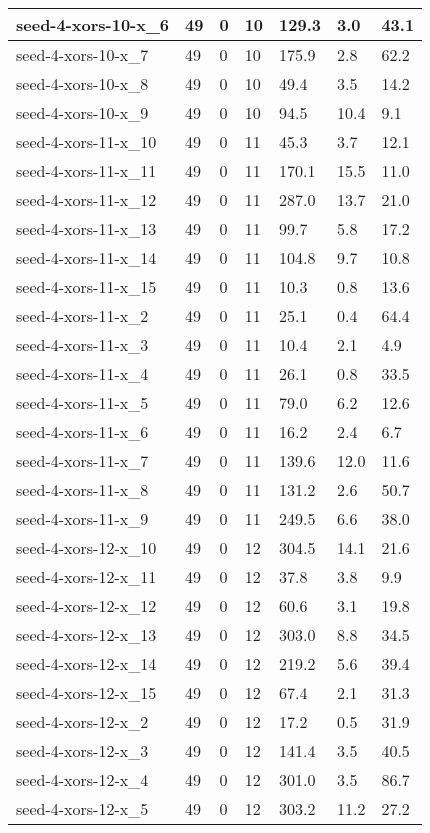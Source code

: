 \begin{scriptsize}
\begin{longtable}{|p{5cm}|l|l|l|l|l|l|}
seed-4-xors-10-x\_6&49&0&10&129.3&3.0&43.1 \\ \hline 
seed-4-xors-10-x\_7&49&0&10&175.9&2.8&62.2 \\ \hline 
seed-4-xors-10-x\_8&49&0&10&49.4&3.5&14.2 \\ \hline 
seed-4-xors-10-x\_9&49&0&10&94.5&10.4&9.1 \\ \hline 
seed-4-xors-11-x\_10&49&0&11&45.3&3.7&12.1 \\ \hline 
seed-4-xors-11-x\_11&49&0&11&170.1&15.5&11.0 \\ \hline 
seed-4-xors-11-x\_12&49&0&11&287.0&13.7&21.0 \\ \hline 
seed-4-xors-11-x\_13&49&0&11&99.7&5.8&17.2 \\ \hline 
seed-4-xors-11-x\_14&49&0&11&104.8&9.7&10.8 \\ \hline 
seed-4-xors-11-x\_15&49&0&11&10.3&0.8&13.6 \\ \hline 
seed-4-xors-11-x\_2&49&0&11&25.1&0.4&64.4 \\ \hline 
seed-4-xors-11-x\_3&49&0&11&10.4&2.1&4.9 \\ \hline 
seed-4-xors-11-x\_4&49&0&11&26.1&0.8&33.5 \\ \hline 
seed-4-xors-11-x\_5&49&0&11&79.0&6.2&12.6 \\ \hline 
seed-4-xors-11-x\_6&49&0&11&16.2&2.4&6.7 \\ \hline 
seed-4-xors-11-x\_7&49&0&11&139.6&12.0&11.6 \\ \hline 
seed-4-xors-11-x\_8&49&0&11&131.2&2.6&50.7 \\ \hline 
seed-4-xors-11-x\_9&49&0&11&249.5&6.6&38.0 \\ \hline 
seed-4-xors-12-x\_10&49&0&12&304.5&14.1&21.6 \\ \hline 
seed-4-xors-12-x\_11&49&0&12&37.8&3.8&9.9 \\ \hline 
seed-4-xors-12-x\_12&49&0&12&60.6&3.1&19.8 \\ \hline 
seed-4-xors-12-x\_13&49&0&12&303.0&8.8&34.5 \\ \hline 
seed-4-xors-12-x\_14&49&0&12&219.2&5.6&39.4 \\ \hline 
seed-4-xors-12-x\_15&49&0&12&67.4&2.1&31.3 \\ \hline 
seed-4-xors-12-x\_2&49&0&12&17.2&0.5&31.9 \\ \hline 
seed-4-xors-12-x\_3&49&0&12&141.4&3.5&40.5 \\ \hline 
seed-4-xors-12-x\_4&49&0&12&301.0&3.5&86.7 \\ \hline 
seed-4-xors-12-x\_5&49&0&12&303.2&11.2&27.2 \\ \hline 

\end{longtable}
\end{scriptsize}
